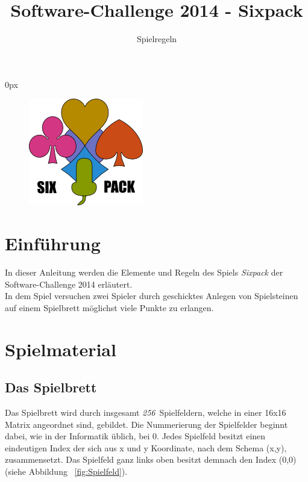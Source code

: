 \documentclass[a4paper, ngerman]{scrartcl}
\title{Software-Challenge 2014 - Sixpack}
\subtitle{Spielregeln}
\newcommand{\SpielFelderAnzahl}{\emph{256}}
\begin{document}
\parindent0px
\maketitle

\begin{figure}[h]
	\centering
	\includegraphics[scale = 1.0]{images/sixpack}
\end{figure}
\vspace*{\fill}

\newpage
\tableofcontents
\newpage

\section{Einführung}
In dieser Anleitung werden die Elemente und Regeln des Spiels \emph{Sixpack}
der Software-Challenge 2014 erläutert.\\
In dem Spiel versuchen zwei Spieler durch geschicktes Anlegen von Spielsteinen auf einem Spielbrett möglichst viele Punkte zu erlangen.

\section{Spielmaterial}
	\subsection{Das Spielbrett}
Das Spielbrett wird durch insgesamt \SpielFelderAnzahl\ Spielfeldern, welche in einer 16x16 Matrix angeordnet sind, gebildet. Die Nummerierung der Spielfelder beginnt dabei, wie in der Informatik üblich, bei 0. Jedes Spielfeld besitzt einen eindeutigen Index der sich aus x und y Koordinate, nach dem Schema (x,y), zusammensetzt. Das Spielfeld ganz links oben besitzt demnach den Index (0,0) (siehe Abbildung ~\ref{fig:Spielfeld}).\\
\end{document}
